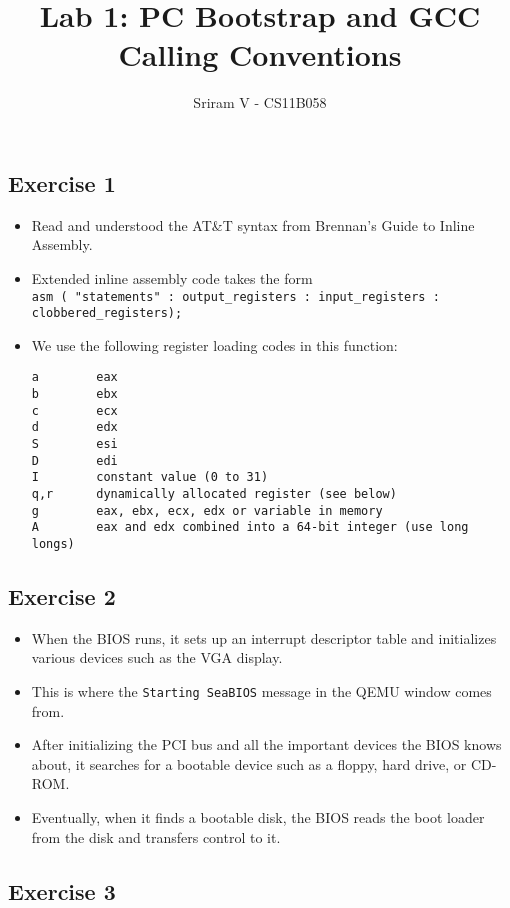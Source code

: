 \documentclass[]{article}
\title{Lab 1: PC Bootstrap and GCC Calling Conventions}
\author{Sriram V - CS11B058}
\date{}
\begin{document}
\maketitle

\subsection{Exercise 1}

\begin{itemize}
\item
  Read and understood the AT\&T syntax from Brennan's Guide to Inline
  Assembly.
\item
  Extended inline assembly code takes the
  form\\\texttt{asm ( "statements" : output\_registers : input\_registers : clobbered\_registers);}
\item
  We use the following register loading codes in this function:

\begin{verbatim}
a        eax
b        ebx
c        ecx
d        edx
S        esi
D        edi
I        constant value (0 to 31)
q,r      dynamically allocated register (see below)
g        eax, ebx, ecx, edx or variable in memory
A        eax and edx combined into a 64-bit integer (use long longs)
\end{verbatim}
\end{itemize}

\subsection{Exercise 2}

\begin{itemize}
\itemsep1pt\parskip0pt
\item
  When the BIOS runs, it sets up an interrupt descriptor table and
  initializes various devices such as the VGA display.
\item
  This is where the \texttt{Starting SeaBIOS} message in the QEMU window
  comes from.
\item
  After initializing the PCI bus and all the important devices the BIOS
  knows about, it searches for a bootable device such as a floppy, hard
  drive, or CD-ROM.
\item
  Eventually, when it finds a bootable disk, the BIOS reads the boot
  loader from the disk and transfers control to it.
\end{itemize}

\subsection{Exercise 3}
\end{document}
